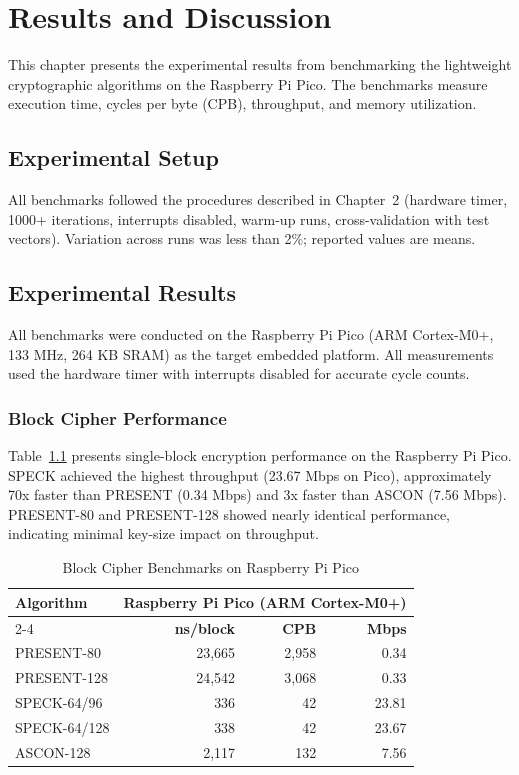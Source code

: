 \documentclass[12pt]{report}
\begin{document}
\chapter{Results and Discussion}

This chapter presents the experimental results from benchmarking the lightweight cryptographic
algorithms on the Raspberry Pi Pico. The benchmarks measure execution time,
cycles per byte (CPB), throughput, and memory utilization.

\section{Experimental Setup}

All benchmarks followed the procedures described in Chapter~2 (hardware timer, 1000+ iterations,
interrupts disabled, warm-up runs, cross-validation with test vectors). Variation across runs
was less than 2\%; reported values are means.

\section{Experimental Results}

All benchmarks were conducted on the Raspberry Pi Pico (ARM Cortex-M0+, 133 MHz, 264 KB SRAM)
as the target embedded platform. All measurements used the hardware timer with interrupts
disabled for accurate cycle counts.

\subsection{Block Cipher Performance}

Table~\ref{tab:block-bench-merged} presents single-block encryption performance on the Raspberry Pi Pico.
SPECK achieved the highest throughput (23.67 Mbps on Pico), approximately 70x faster than PRESENT
(0.34 Mbps) and 3x faster than ASCON (7.56 Mbps). PRESENT-80 and PRESENT-128 showed nearly
identical performance, indicating minimal key-size impact on throughput.

\begin{table}[H]
    \centering
    \begin{tabular}{lrrr}
        \toprule
        \textbf{Algorithm} & \multicolumn{3}{c}{\textbf{Raspberry Pi Pico (ARM Cortex-M0+)}} \\
        \cmidrule{2-4}
         & \textbf{ns/block} & \textbf{CPB} & \textbf{Mbps} \\
        \midrule
        PRESENT-80 & 23,665 & 2,958 & 0.34 \\
        PRESENT-128 & 24,542 & 3,068 & 0.33 \\
        SPECK-64/96 & 336 & 42 & 23.81 \\
        SPECK-64/128 & 338 & 42 & 23.67 \\
        ASCON-128 & 2,117 & 132 & 7.56 \\
        \bottomrule
    \end{tabular}
    \caption{Block Cipher Benchmarks on Raspberry Pi Pico}
    \label{tab:block-bench-merged}
\end{table}
\end{document}
